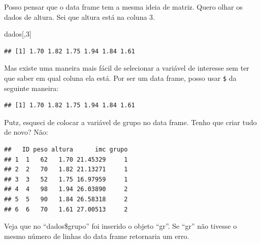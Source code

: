\documentclass[
]{book}
\newenvironment{Shaded}{\begin{snugshade}}{\end{snugshade}}
\newcommand{\DecValTok}[1]{\textcolor[rgb]{0.00,0.00,0.81}{#1}}
\newcommand{\KeywordTok}[1]{\textcolor[rgb]{0.13,0.29,0.53}{\textbf{#1}}}
\newcommand{\NormalTok}[1]{#1}
\newcommand{\OperatorTok}[1]{\textcolor[rgb]{0.81,0.36,0.00}{\textbf{#1}}}
\newcommand{\StringTok}[1]{\textcolor[rgb]{0.31,0.60,0.02}{#1}}
\begin{document}
Posso pensar que o data frame tem a mesma ideia de matriz. Quero olhar os dados de altura. Sei que altura está na coluna 3.

\begin{Shaded}
\begin{Highlighting}[]
\NormalTok{dados[,}\DecValTok{3}\NormalTok{]}
\end{Highlighting}
\end{Shaded}

\begin{verbatim}
## [1] 1.70 1.82 1.75 1.94 1.84 1.61
\end{verbatim}

Mas existe uma maneira mais fácil de selecionar a variável de interesse sem ter que saber em qual coluna ela está.
Por ser um data frame, posso usar \texttt{\$} da seguinte maneira:

\begin{Shaded}
\end{Shaded}

\begin{verbatim}
## [1] 1.70 1.82 1.75 1.94 1.84 1.61
\end{verbatim}

Putz, esqueci de colocar a variável de grupo no data frame. Tenho que criar tudo de novo? Não:

\begin{Shaded}
\end{Shaded}

\begin{verbatim}
##   ID peso altura      imc grupo
## 1  1   62   1.70 21.45329     1
## 2  2   70   1.82 21.13271     1
## 3  3   52   1.75 16.97959     1
## 4  4   98   1.94 26.03890     2
## 5  5   90   1.84 26.58318     2
## 6  6   70   1.61 27.00513     2
\end{verbatim}

Veja que no ``dados\$grupo'' foi inserido o objeto ``gr''. Se ``gr'' não tivesse o mesmo número de linhas do data frame retornaria um erro.
\end{document}
